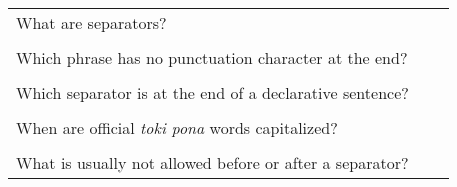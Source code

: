 \begin{supertabular}{p{5cm}|ll}
    What are separators?                                     &  & \\
                                                             &  & \\
    Which phrase has no punctuation character at the end?    &  & \\
                                                             &  & \\
    Which separator is at the end of a declarative sentence? &  & \\
                                                             &  & \\
    When are official \textit{toki pona} words capitalized?  &  & \\
                                                             &  & \\
    What is usually not allowed before or after a separator? &  & \\
\end{supertabular}
